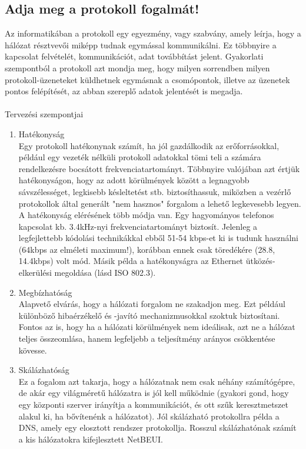 \documentclass[12pt, a4paper]{article}
\begin{document}
\subsection{Adja meg a protokoll fogalmát!}
Az informatikában a protokoll egy egyezmény, vagy szabvány, amely leírja, hogy a hálózat résztvevői miképp tudnak egymással kommunikálni. Ez többnyire a kapcsolat felvételét, kommunikációt, adat továbbítást jelent. Gyakorlati szempontból a protokoll azt mondja meg, hogy milyen sorrendben milyen protokoll-üzeneteket küldhetnek egymásnak a csomópontok, illetve az üzenetek pontos felépítését, az abban szereplő adatok jelentését is megadja.
\\\\
Tervezési szempontjai
\begin{enumerate}
\item
Hatékonyság\\
Egy protokoll hatékonynak számít, ha jól gazdálkodik az erőforrásokkal, például egy vezeték nélküli protokoll adatokkal tömi teli a számára rendelkezésre bocsátott frekvenciatartományt. Többnyire valójában azt értjük hatékonyságon, hogy az adott körülmények között a legnagyobb sávszélességet, legkisebb késleltetést stb. biztosíthassuk, miközben a vezérlő protokollok által generált "nem hasznos" forgalom a lehető legkevesebb legyen. A hatékonyság elérésének több módja van. Egy hagyományos telefonos kapcsolat kb. 3.4kHz-nyi frekvenciatartományt biztosít. Jelenleg a legfejlettebb kódolási technikákkal ebből 51-54 kbps-et ki is tudunk használni (64kbps az elméleti maximum!), korábban ennek csak töredékére (28.8, 14.4kbps) volt mód. Másik példa a hatékonyságra az Ethernet ütközés-elkerülési megoldása (lásd ISO 802.3).
\item
Megbízhatóság\\
Alapvető elvárás, hogy a hálózati forgalom ne szakadjon meg. Ezt például különböző hibaérzékelő és -javító mechanizmusokkal szoktuk biztosítani. Fontos az is, hogy ha a hálózati körülmények nem ideálisak, azt ne a hálózat teljes összeomlása, hanem legfeljebb a teljesítmény arányos csökkentése kövesse.
\item
Skálázhatóság\\
Ez a fogalom azt takarja, hogy a hálózatnak nem csak néhány számítógépre, de akár egy világméretű hálózatra is jól kell működnie (gyakori gond, hogy egy központi szerver irányítja a kommunikációt, és ott szűk keresztmetszet alakul ki, ha bővítenénk a hálózatot). Jól skálázható protokollra példa a DNS, amely egy elosztott rendszer protokollja. Rosszul skálázhatónak számít a kis hálózatokra kifejlesztett NetBEUI.
\end{enumerate}
\end{document}
